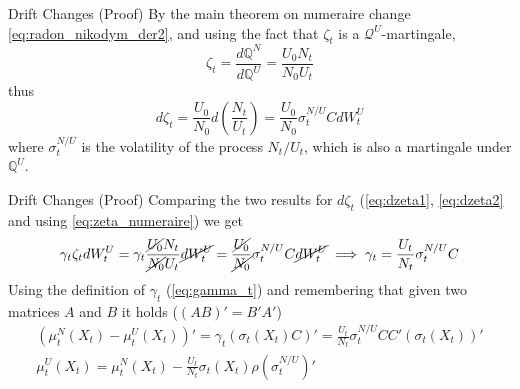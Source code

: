 \documentclass{beamer}
\begin{document}
\begin{frame}{Drift Changes (Proof)}
  By the main theorem on numeraire change \cref{eq:radon_nikodym_der2}, and using the fact that $\zeta_t$ is a $\mathcal{Q}^U$-martingale, 
  \begin{equation}
    \zeta_t = \frac{d\mathbb{Q}^N}{d\mathbb{Q}^U} = \frac{U_0N_t}{N_0U_t}
    \label{eq:zeta_numeraire}
  \end{equation}
  thus
  \begin{equation}
    d\zeta_t= \frac{U_0}{N_0}d\left(\frac{N_t}{U_t}\right)= \frac{U_0}{N_0}\sigma_t^{N/U}CdW_t^U
    \label{eq:dzeta2}
  \end{equation}
  where $\sigma^{N/U}_t$ is the volatility of the process $N_t/U_t$, which is also a martingale under $\mathbb{Q}^U$.
\end{frame}
  
\begin{frame}{Drift Changes (Proof)}
  Comparing the two results for $d\zeta_t$ (\cref{eq:dzeta1}, \cref{eq:dzeta2} and using \cref{eq:zeta_numeraire}) we get
  \begin{equation*}
    \begin{gathered}
      \gamma_t\zeta_tdW_t^U = \gamma_t\frac{\cancel{U_0}N_t}{\cancel{N_0}U_t}\cancel{dW_t^U}=	\frac{\cancel{U_0}}{\cancel{N_0}}\sigma^{N/U}_tC\cancel{dW_t^U} \implies 
      \gamma_t = \frac{U_t}{N_t}\sigma^{N/U}_tC
    \end{gathered}
  \end{equation*}
  \pause
  Using the definition of $\gamma_t$ (\cref{eq:gamma_t}) and remembering that given two matrices $A$ and $B$ it holds ($(AB)' = B'A'$)
  \begin{equation}
    \begin{gathered}
    (\mu_t^N(X_t)-\mu_t^U(X_t))'= \gamma_t (\sigma_t(X_t)C)'=\frac{U_t}{N_t}\sigma^{N/U}_t CC'(\sigma_t(X_t))'\\
    \mu_t^U(X_t)=\mu_t^N(X_t)-\frac{U_t}{N_t}\sigma_t(X_t)\rho(\sigma^{N/U}_t)'
    \end{gathered}
  \label{eq:gamma}
\end{equation}
\end{frame}
\end{document}
